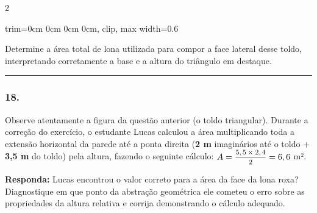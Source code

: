 \documentclass[twoside, 10pt, a4paper]{article}
\newlength{\espacoPreQuestao}\setlength{\espacoPreQuestao}{0.1cm}
\newlength{\espacoQuestao}\setlength{\espacoQuestao}{0.2cm}
\begin{document}
\begin{multicols*}{2}
\begin{center}
\begin{adjustbox}{trim=0cm 0cm 0cm 0cm, clip, max width=0.6\linewidth}
\end{adjustbox}
\end{center}

Determine a área total de lona utilizada para compor a face lateral desse toldo, interpretando corretamente a base e a altura do triângulo em destaque.
\par\vspace{\espacoQuestao}

\noindent\textcolor{CorLinha}{\rule{\linewidth}{0.5pt}}
\par\vspace{\espacoPreQuestao}
\subsubsection*{18.} Observe atentamente a figura da questão anterior (o toldo triangular). Durante a correção do exercício, o estudante Lucas calculou a área multiplicando toda a extensão horizontal da parede até a ponta direita (\textbf{2 m} imaginários até o toldo + \textbf{3,5 m} do toldo) pela altura, fazendo o seguinte cálculo: $ A = \mfrac{5,5 \times 2,4}{2} = 6,6 $ m².
\begin{boxresponda}
\textbf{Responda:} Lucas encontrou o valor correto para a área da face da lona roxa? Diagnostique em que ponto da abstração geométrica ele cometeu o erro sobre as propriedades da altura relativa e corrija demonstrando o cálculo adequado.
\end{boxresponda}
\par\vspace{\espacoQuestao}


\end{multicols*}
\end{document}
